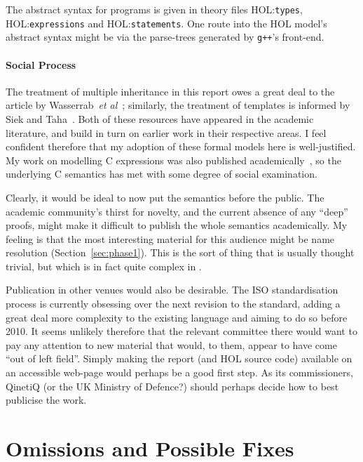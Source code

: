 \documentclass[11pt]{article}
\newcommand{\HOLfile}[1]{HOL:\texttt{#1}}
\begin{document}
The abstract syntax for \cpp{} programs is given in theory files
\HOLfile{types}, \HOLfile{expressions} and \HOLfile{statements}.  One
route into the HOL model's abstract syntax might be via the
parse-trees generated by \texttt{g++}'s front-end.

\paragraph{Social Process}
The treatment of multiple inheritance in this report owes a great deal
to the article by Wasserrab~\emph{et
  al}~\cite{wasserrab-nst-OOPSLA06}; similarly, the treatment of
templates is informed by Siek and Taha~\cite{DBLP:conf/ecoop/SiekT06}.
Both of these resources have appeared in the academic literature, and
build in turn on earlier work in their respective areas.  I feel
confident therefore that my adoption of these formal models here is
well-justified.  My work on modelling C expressions was also published
academically~\cite{norrish99}, so the underlying C semantics has met
with some degree of social examination.

Clearly, it would be ideal to now put the \cpp{} semantics before the
public.  The academic community's thirst for novelty, and the current
absence of any ``deep'' proofs, might make it difficult to publish the
whole semantics academically.  My feeling is that the most interesting
material for this audience might be name resolution
(Section~\ref{sec:phase1}). This is the sort of thing that is usually
thought trivial, but which is in fact quite complex in \cpp{}.

Publication in other venues would also be desirable.  The ISO
standardisation process is currently obsessing over the next revision
to the standard, adding a great deal more complexity to the existing
language and aiming to do so before 2010.  It seems unlikely therefore
that the relevant committee there would want to pay any attention to
new material that would, to them, appear to have come ``out of left
field''.  Simply making the report (and HOL source code) available on
an accessible web-page would perhaps be a good first step.  As its
commissioners, QinetiQ (or the UK Ministry of Defence?) should perhaps
decide how to best publicise the work.



\section{Omissions and Possible Fixes}
\label{sec:omissions}
\end{document}
